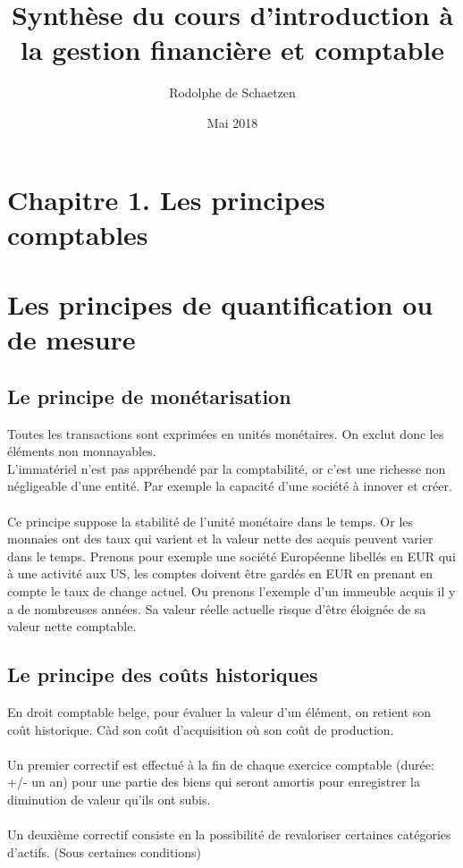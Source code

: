 \documentclass{article}
\title{Synthèse du cours d'introduction à la gestion financière et comptable}
\author{Rodolphe de Schaetzen}
\date{Mai 2018}
\begin{document}
\maketitle
\newpage
\tableofcontents

\section*{Chapitre 1. Les principes comptables}

\section{Les principes de quantification ou de mesure}
\subsection{Le principe de monétarisation}
Toutes les transactions sont exprimées en unités monétaires. On exclut donc les éléments non monnayables. \\
L'immatériel n'est pas appréhendé par la comptabilité, or c'est une richesse non négligeable d'une entité. Par exemple la capacité d'une société à innover et créer.\\ \\
Ce principe suppose la stabilité de l'unité monétaire dans le temps. Or les monnaies ont des taux qui varient et la valeur nette des acquis peuvent varier dans le temps. Prenons pour exemple une société Européenne libellés en EUR qui à une activité aux US, les comptes doivent être gardés en EUR en prenant en compte le taux de change actuel. Ou prenons l'exemple d'un immeuble acquis il y a de nombreuses années. Sa valeur réelle actuelle risque d'être éloignée de sa valeur nette comptable. \\

\subsection{Le principe des coûts historiques}
En droit comptable belge, pour évaluer la valeur d'un élément, on retient son coût historique. Càd son coût d'acquisition où son coût de production.\\ \\
Un premier correctif est effectué à la fin de chaque exercice comptable (durée: +/- un an) pour une partie des biens qui seront amortis pour enregistrer la diminution de valeur qu'ils ont subis. \\ \\
Un deuxième correctif consiste en la possibilité de revaloriser certaines catégories d'actifs. (Sous certaines conditions) \\
\end{document}
